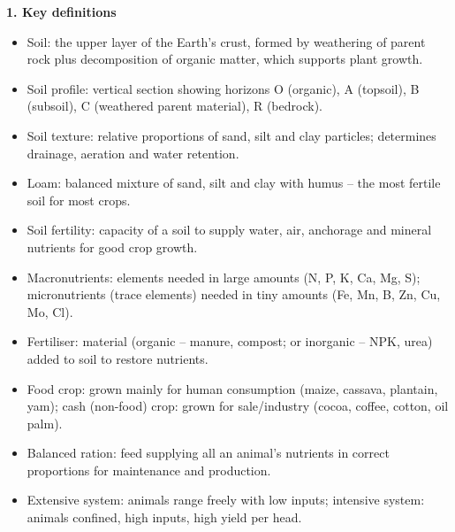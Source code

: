 \documentclass[11pt]{article}
\newcommand{\cle}[1]{{\popxbold\color{popdark}#1}}
\begin{document}
\begin{bilan}

\textbf{1. Key definitions}
\begin{itemize}
\item \cle{Soil}: the upper layer of the Earth's crust, formed by weathering of parent rock plus decomposition of organic matter, which supports plant growth.
\item \cle{Soil profile}: vertical section showing horizons O (organic), A (topsoil), B (subsoil), C (weathered parent material), R (bedrock).
\item \cle{Soil texture}: relative proportions of sand, silt and clay particles; determines drainage, aeration and water retention.
\item \cle{Loam}: balanced mixture of sand, silt and clay with humus -- the most fertile soil for most crops.
\item \cle{Soil fertility}: capacity of a soil to supply water, air, anchorage and mineral nutrients for good crop growth.
\item \cle{Macronutrients}: elements needed in large amounts (N, P, K, Ca, Mg, S); \cle{micronutrients} (trace elements) needed in tiny amounts (Fe, Mn, B, Zn, Cu, Mo, Cl).
\item \cle{Fertiliser}: material (organic -- manure, compost; or inorganic -- NPK, urea) added to soil to restore nutrients.
\item \cle{Food crop}: grown mainly for human consumption (maize, cassava, plantain, yam); \cle{cash (non-food) crop}: grown for sale/industry (cocoa, coffee, cotton, oil palm).
\item \cle{Balanced ration}: feed supplying all an animal's nutrients in correct proportions for maintenance and production.
\item \cle{Extensive system}: animals range freely with low inputs; \cle{intensive system}: animals confined, high inputs, high yield per head.
\end{itemize}


\end{bilan}
\end{document}
